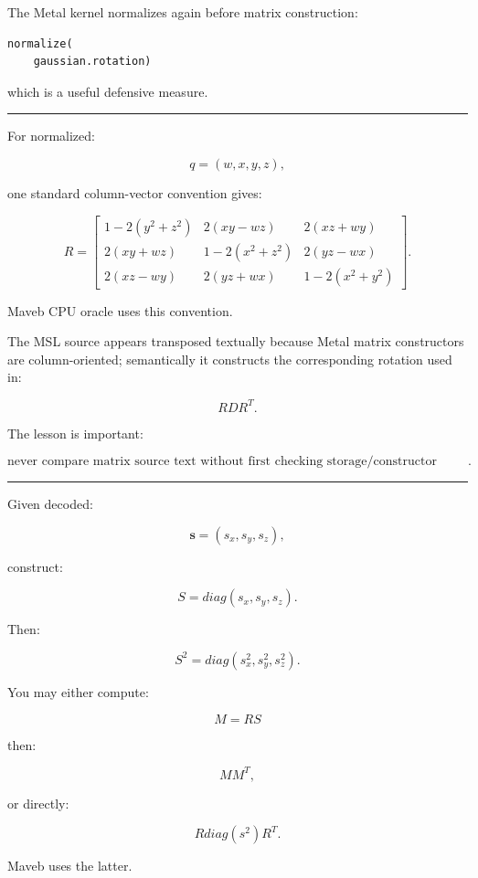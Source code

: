 The Metal kernel normalizes again before matrix construction:

\begin{verbatim}
normalize(
    gaussian.rotation)
\end{verbatim}

which is a useful defensive measure.

\begin{center}\rule{0.5\linewidth}{0.5pt}\end{center}

For normalized:

\[
q=(w,x,y,z),
\]

one standard column-vector convention gives:

\[
R=
\begin{bmatrix}
1-2(y^2+z^2)
&
2(xy-wz)
&
2(xz+wy)
\\
2(xy+wz)
&
1-2(x^2+z^2)
&
2(yz-wx)
\\
2(xz-wy)
&
2(yz+wx)
&
1-2(x^2+y^2)
\end{bmatrix}.
\]

Maveb CPU oracle uses this convention.

The MSL source appears transposed textually because Metal matrix constructors are column-oriented; semantically it constructs the corresponding rotation used in:

\[
RDR^T.
\]

The lesson is important:

\[
\boxed{
\text{never compare matrix source text without first checking storage/constructor convention}.
}
\]

\begin{center}\rule{0.5\linewidth}{0.5pt}\end{center}

Given decoded:

\[
\mathbf s=
(s_x,s_y,s_z),
\]

construct:

\[
S=
diag(s_x,s_y,s_z).
\]

Then:

\[
S^2=
diag(
s_x^2,
s_y^2,
s_z^2
).
\]

You may either compute:

\[
M=RS
\]

then:

\[
MM^T,
\]

or directly:

\[
R
diag(s^2)
R^T.
\]

Maveb uses the latter.

